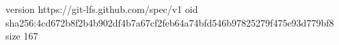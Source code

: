 version https://git-lfs.github.com/spec/v1
oid sha256:4cd672b8f2b4b902df4b7a67cf2feb64a74bfd546b97825279f475e93d779bf8
size 167
